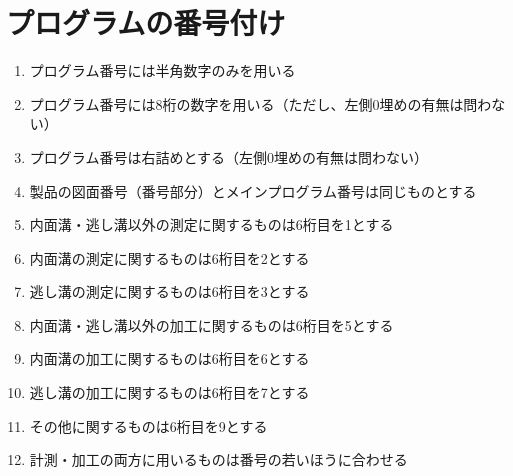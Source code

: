 \section{プログラムの番号付け}
\begin{enumerate}
\item プログラム番号には半角数字のみを用いる
\item プログラム番号には8桁の数字を用いる（ただし、左側0埋めの有無は問わない）
\item プログラム番号は右詰めとする（左側0埋めの有無は問わない）
\item 製品の図面番号（番号部分）とメインプログラム番号は同じものとする
\item 内面溝・逃し溝以外の測定に関するものは6桁目を1とする
\item 内面溝の測定に関するものは6桁目を2とする
\item 逃し溝の測定に関するものは6桁目を3とする
\item 内面溝・逃し溝以外の加工に関するものは6桁目を5とする
\item 内面溝の加工に関するものは6桁目を6とする
\item 逃し溝の加工に関するものは6桁目を7とする
\item その他に関するものは6桁目を9とする
\item 計測・加工の両方に用いるものは番号の若いほうに合わせる
\end{enumerate}
